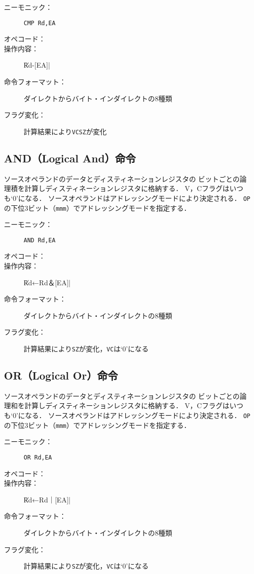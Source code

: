 \begin{description}
\item[ニーモニック：] \texttt{CMP Rd,EA}
\item[オペコード：] 
\item[操作内容：] \|Rd-[EA]|
\item[命令フォーマット：] ダイレクトからバイト・インダイレクトの8種類
\item[フラグ変化：] 計算結果により\texttt{VCSZ}が変化
\end{description}

\subsection{AND（Logical And）命令}
ソースオペランドのデータとディスティネーションレジスタの
ビットごとの論理積を計算しディスティネーションレジスタに格納する．
V，Cフラグはいつも`0'になる．
ソースオペランドはアドレッシングモードにより決定される．
\texttt{OP}の下位3ビット（\texttt{mmm}）でアドレッシングモードを指定する．

\begin{description}
\item[ニーモニック：] \texttt{AND Rd,EA}
\item[オペコード：] 
\item[操作内容：] \|Rd←Rd＆[EA]|
\item[命令フォーマット：] ダイレクトからバイト・インダイレクトの8種類
\item[フラグ変化：] 計算結果により\texttt{SZ}が変化，\texttt{VC}は`0'になる
\end{description}

\subsection{OR（Logical Or）命令}
ソースオペランドのデータとディスティネーションレジスタの
ビットごとの論理和を計算しディスティネーションレジスタに格納する．
V，Cフラグはいつも`0'になる．
ソースオペランドはアドレッシングモードにより決定される．
\texttt{OP}の下位3ビット（\texttt{mmm}）でアドレッシングモードを指定する．

\begin{description}
\item[ニーモニック：] \texttt{OR Rd,EA}
\item[オペコード：] 
\item[操作内容：] \|Rd←Rd｜[EA]|
\item[命令フォーマット：] ダイレクトからバイト・インダイレクトの8種類
\item[フラグ変化：] 計算結果により\texttt{SZ}が変化，\texttt{VC}は`0'になる
\end{description}

